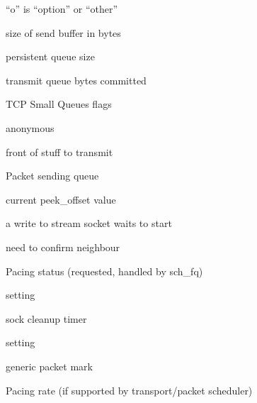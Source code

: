 \documentclass[a4paper,8pt,english]{sphinxmanual}
\begin{document}
\begin{description}
\item[{}] \leavevmode
``o'' is ``option'' or ``other''

\item[{}] \leavevmode
size of send buffer in bytes

\item[{}] \leavevmode
persistent queue size

\item[{}] \leavevmode
transmit queue bytes committed

\item[{}] \leavevmode
TCP Small Queues flags

\item[{}] \leavevmode
anonymous

\item[{}] \leavevmode
front of stuff to transmit

\item[{}] \leavevmode
Packet sending queue

\item[{}] \leavevmode
current peek\_offset value

\item[{}] \leavevmode
a write to stream socket waits to start

\item[{}] \leavevmode
need to confirm neighbour

\item[{}] \leavevmode
Pacing status (requested, handled by sch\_fq)

\item[{}] \leavevmode
{} setting

\item[{}] \leavevmode
sock cleanup timer

\item[{}] \leavevmode
{} setting

\item[{}] \leavevmode
generic packet mark

\item[{}] \leavevmode
Pacing rate (if supported by transport/packet scheduler)


\end{description}
\end{document}
